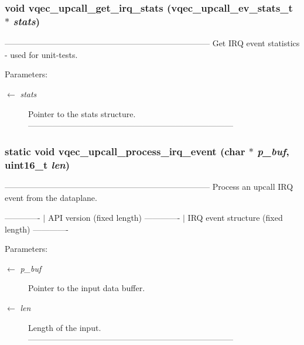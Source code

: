 \subsubsection{\setlength{\rightskip}{0pt plus 5cm}void vqec\_\-upcall\_\-get\_\-irq\_\-stats (\bf{vqec\_\-upcall\_\-ev\_\-stats\_\-t} $\ast$ {\em stats})}\label{vqec__upcall__event_8c_2f4a8fcca9020fae5255a967c2f54f14}


--------------------------------------------------------------------------- Get IRQ event statistics - used for unit-tests.

\begin{Desc}
\item[Parameters:]
\begin{description}
\item[\mbox{$\leftarrow$} {\em stats}]Pointer to the stats structure. --------------------------------------------------------------------------- \end{description}
\end{Desc}
\subsubsection{\setlength{\rightskip}{0pt plus 5cm}static void vqec\_\-upcall\_\-process\_\-irq\_\-event (char $\ast$ {\em p\_\-buf}, uint16\_\-t {\em len})\hspace{0.3cm}{\tt  [static]}}\label{vqec__upcall__event_8c_ae140b5d1eb4c411a3c933d07117d858}


--------------------------------------------------------------------------- Process an upcall IRQ event from the dataplane.

------------- $|$ API version (fixed length) ------------- $|$ IRQ event structure (fixed length) -------------

\begin{Desc}
\item[Parameters:]
\begin{description}
\item[\mbox{$\leftarrow$} {\em p\_\-buf}]Pointer to the input data buffer. \item[\mbox{$\leftarrow$} {\em len}]Length of the input. --------------------------------------------------------------------------- \end{description}
\end{Desc}
